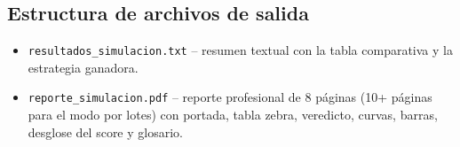 \documentclass[spanish,notitlepage,letterpaper, 12pt]{article}
\begin{document}
\subsection{Estructura de archivos de salida}

\begin{itemize}
    \item \texttt{resultados\_simulacion.txt} -- resumen textual con la tabla comparativa y la estrategia ganadora.
    \item \texttt{reporte\_simulacion.pdf} -- reporte profesional de 8 p\'aginas (10+ p\'aginas para el modo por lotes) con portada, tabla zebra, veredicto, curvas, barras, desglose del score y glosario.
\end{itemize}
\end{document}
